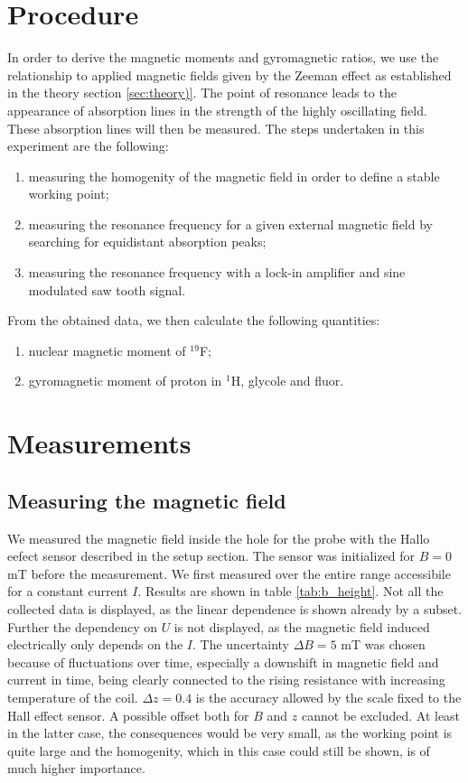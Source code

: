\section{Procedure}
\label{sec:procedure}
In order to derive the magnetic moments and gyromagnetic ratios, 
we use the relationship to applied magnetic fields given by the Zeeman effect 
as established in the theory section \ref{sec:theory)}. 
The point of resonance leads to the appearance of absorption lines 
in the strength of the highly oscillating field. These absorption lines 
will then be measured. 
The steps undertaken in this experiment are the following:
\begin{enumerate}
\item
measuring the homogenity of the magnetic field in order to define a stable working point;
\item
measuring the resonance frequency for a given external magnetic field by searching for 
equidistant absorption peaks;
\item
measuring the resonance frequency with a lock-in amplifier and sine modulated saw tooth signal.
\end{enumerate}
From the obtained data, we then calculate the following quantities:
\begin{enumerate}
\item
nuclear magnetic moment of $^19$F;
\item
gyromagnetic moment of proton in $^1$H, glycole and fluor.
\end{enumerate}


\section{Measurements}

\subsection{Measuring the magnetic field}
We measured the magnetic field inside the hole for the probe with the Hallo eefect sensor described in the setup section. 
The sensor was initialized for $B = 0$ mT before the measurement. We first measured over the 
entire range accessibile for a constant current $I$. Results are shown in table \ref{tab:b_height}. 
Not all the collected data is displayed, as the linear dependence is shown already by a subset. Further 
the dependency on $U$ is not displayed, as the magnetic field induced electrically only depends on the 
$I$. The uncertainty $\Delta B = 5$ mT was chosen because of fluctuations over time, especially a 
downshift in magnetic field and current in time, being clearly connected to the rising resistance with 
increasing temperature of the coil. $\Delta z = 0.4$ is the accuracy allowed by the scale fixed to the 
Hall effect sensor. A possible offset both for $B$ and $z$ cannot be excluded. At least in the latter case, 
the consequences would be very small, as the working point is quite large and the homogenity, which 
in this case could still be shown, is of much higher importance. 

 
